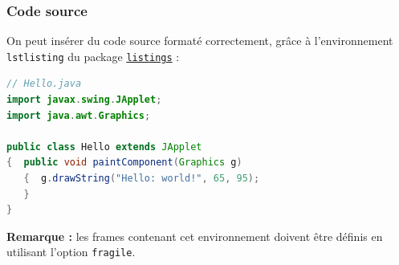 \documentclass[10pt,    %
    french,             %
    xcolor=table,       %
    envcountsect,       %
    aspectratio=43      %
]{beamer}
\begin{document}
\begin{frame}[fragile]
    \frametitle{Code source}
    \label{frm:sourcecode}
    
    On peut insérer du code source formaté correctement, grâce à l'environnement \texttt{lstlisting} du package \href{https://ctan.org/pkg/listings?lang=en}{\texttt{listings}} :
    
    \begin{lstlisting}[language=Java,caption={Applet Java Hello World.},label={lst:hello}]
// Hello.java
import javax.swing.JApplet;
import java.awt.Graphics;

public class Hello extends JApplet
{  public void paintComponent(Graphics g) 
   {  g.drawString("Hello: world!", 65, 95);
   }    
}
    \end{lstlisting}
    
    \vspace{0.25cm}
    \textbf{Remarque :} les frames contenant cet environnement doivent être définis en utilisant l'option \texttt{fragile}.
    
    
\end{frame}
\end{document}
